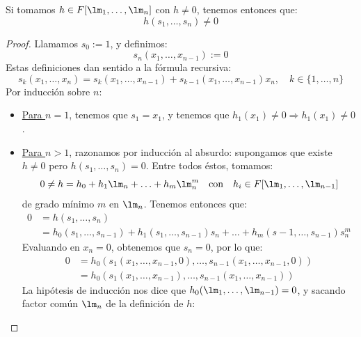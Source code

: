 \begin{lema}
    Si tomamos $h\in F[\lm_1, \ldots, \lm_n]$ con $h\neq 0$, tenemos entonces que:
    \begin{equation*}
        h(s_1, \ldots, s_n) \neq 0
    \end{equation*}
    \begin{proof}
        Llamamos $s_0 := 1$, y definimos:
        \begin{equation*}
            s_n(x_1, \ldots, x_{n-1}) := 0
        \end{equation*}
        Estas definiciones dan sentido a la fórmula recursiva:
        \begin{equation*}
            s_k(x_1, \ldots, x_n) = s_k(x_1, \ldots, x_{n-1}) + s_{k-1}(x_1, \ldots, x_{n-1})x_n, \quad k \in \{1,\ldots,n\}
        \end{equation*}
        Por inducción sobre $n$:
        \begin{itemize}
            \item \underline{Para $n=1$}, tenemos que $s_1 = x_1$, y tenemos que $h_1(x_1)\neq 0 \Longrightarrow h_1(x_1)\neq 0$.
            \item \underline{Para $n>1$}, razonamos por inducción al absurdo: supongamos que existe $h\neq 0$ pero $h(s_1, \ldots, s_n) = 0$. Entre todos éstos, tomamos:
                \begin{equation*}
                    0\neq h = h_0 + h_1\lm_n + \ldots + h_m \lm_n^m \quad \text{con} \quad h_i \in F[\lm_1, \ldots, \lm_{n-1}]
                \end{equation*}
                de grado mínimo $m$ en $\lm_n$. Tenemos entonces que:
                \begin{align*}
                    0 &= h(s_1, \ldots, s_n) \\
                      &= h_0(s_1, \ldots, s_{n-1}) + h_1(s_1, \ldots, s_{n-1})s_ n + \ldots + h_m(s-1, \ldots, s_{n-1})s_n^m
                \end{align*}
                Evaluando en $x_n = 0$, obtenemos que $s_n = 0$, por lo que:
                \begin{align*}
                    0 &= h_0(s_1(x_1,\ldots,x_{n-1},0) , \ldots , s_{n-1}(x_1, \ldots, x_{n-1},0)) \\
                      &= h_0(s_1(x_1, \ldots, x_{n-1}), \ldots, s_{n-1}(x_1, \ldots, x_{n-1}))
                \end{align*}
                La hipótesis de inducción nos dice que $h_0(\lm_1,\ldots,\lm_{n-1}) = 0$, y sacando factor común $\lm_n$ de la definición de $h$:

\end{itemize}
\end{proof}
\end{lema}
